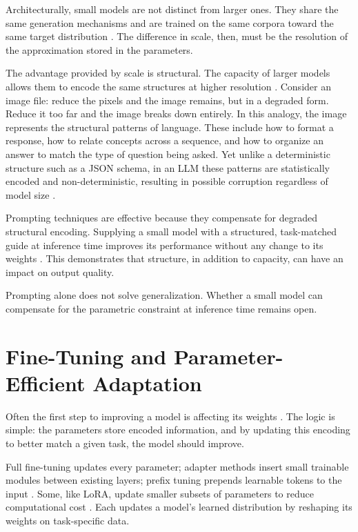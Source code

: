 \documentclass[master]{thesis}
\begin{document}
Architecturally, small models are not distinct from larger ones. They share the same generation mechanisms and are trained on the same corpora toward the same target distribution \cite{godey2024softmax, costofdownscaling2023}. The difference in scale, then, must be the resolution of the approximation stored in the parameters.

The advantage provided by scale is structural. The capacity of larger models allows them to encode the same structures at higher resolution \cite{godey2024softmax}. Consider an image file: reduce the pixels and the image remains, but in a degraded form. Reduce it too far and the image breaks down entirely. In this analogy, the image represents the structural patterns of language. These include how to format a response, how to relate concepts across a sequence, and how to organize an answer to match the type of question being asked. Yet unlike a deterministic structure such as a JSON schema, in an LLM these patterns are statistically encoded and non-deterministic, resulting in possible corruption regardless of model size \cite{math_reasoning_limits2024, lrm_complexity2025}.

Prompting techniques are effective because they compensate for degraded structural encoding. Supplying a small model with a structured, task-matched guide at inference time improves its performance without any change to its weights \cite{han2025blueprints}. This demonstrates that structure, in addition to capacity, can have an impact on output quality.

Prompting alone does not solve generalization. Whether a small model can compensate for the parametric constraint at inference time remains open.

\section{Fine-Tuning and Parameter-Efficient Adaptation}
\label{sec:finetune-lit}

Often the first step to improving a model is affecting its weights \cite{peft_survey2024}. The logic is simple: the parameters store encoded information, and by updating this encoding to better match a given task, the model should improve.

Full fine-tuning updates every parameter; adapter methods insert small trainable modules between existing layers; prefix tuning prepends learnable tokens to the input \cite{hu2022lora, houlsby2019adapters, li2021prefixtuning}. Some, like LoRA, update smaller subsets of parameters to reduce computational cost \cite{hu2022lora}. Each updates a model's learned distribution by reshaping its weights on task-specific data.
\end{document}
